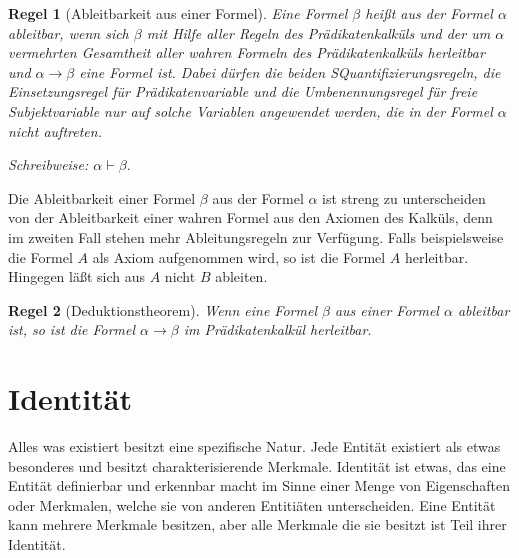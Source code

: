 \documentclass[a4paper,german,10pt,twoside]{book}
\newtheorem{rul}{Regel}
\theoremstyle{definition}
\theoremstyle{remark}
\begin{document}
\begin{rul}[Ableitbarkeit aus einer Formel]
\label{rule:definitionDeductionFromFormula} \hypertarget{rule:definitionDeductionFromFormula}{}
Eine Formel $\beta$ hei{\ss}t \emph{aus der Formel $\alpha$ ableitbar}, wenn sich $\beta$ mit Hilfe aller Regeln des Pr{\"a}dikatenkalk{\"u}ls und der um $\alpha$ vermehrten Gesamtheit aller wahren Formeln des Pr{\"a}dikatenkalk{\"u}ls herleitbar und $\alpha \rightarrow \beta$ eine Formel ist. Dabei d{\"u}rfen die beiden SQuantifizierungsregeln, die Einsetzungsregel f{\"u}r Pr{\"a}dikatenvariable und die Umbenennungsregel f{\"u}r freie Subjektvariable nur auf solche Variablen angewendet werden, die in der Formel $\alpha$ nicht auftreten.

\par
Schreibweise: $\alpha \vdash \beta$.
\end{rul}

Die Ableitbarkeit einer Formel $\beta$ aus der Formel $\alpha$ ist streng zu unterscheiden von der Ableitbarkeit einer wahren Formel aus den Axiomen des Kalk{\"u}ls, denn im zweiten Fall stehen mehr Ableitungsregeln zur Verf{\"u}gung. Falls beispielsweise die Formel $A$ als Axiom aufgenommen wird, so ist die Formel $A$ herleitbar. Hingegen l{\"a}{\ss}t sich aus $A$ nicht $B$ ableiten.


\par


\begin{rul}[Deduktionstheorem]
\label{rule:deductionTheorem} \hypertarget{rule:deductionTheorem}{}
Wenn eine Formel $\beta$ aus einer Formel $\alpha$ ableitbar ist, so ist die Formel $\alpha \rightarrow \beta$ im Pr{\"a}dikatenkalk{\"u}l herleitbar.
\end{rul}






\chapter{Identit{\"a}t} \label{chapter6} \hypertarget{chapter6}{}

Alles was existiert besitzt eine spezifische Natur. Jede Entit{\"a}t existiert als etwas besonderes und besitzt charakterisierende Merkmale. Identit{\"a}t ist etwas, das eine Entit{\"a}t definierbar und erkennbar macht im Sinne einer Menge von Eigenschaften oder Merkmalen, welche sie von anderen Entiti{\"a}ten unterscheiden. Eine Entit{\"a}t kann mehrere Merkmale besitzen, aber alle Merkmale die sie besitzt ist Teil ihrer Identit{\"a}t.
\end{document}
